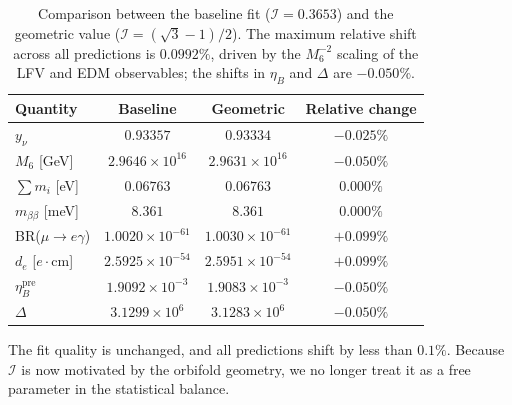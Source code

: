 \documentclass[12pt,a4paper]{article}
\numberwithin{equation}{section}
\begin{document}
\begin{table}[H]
\centering
\caption{Comparison between the baseline fit (\(\mathcal I = 0.3653\)) and the geometric value (\(\mathcal I = (\sqrt{3}-1)/2\)). The maximum relative shift across all predictions is \(0.0992\%\), driven by the \(M_6^{-2}\) scaling of the LFV and EDM observables; the shifts in \(\eta_B\) and \(\Delta\) are \(-0.050\%\).}
\label{tab:I_check}
\begin{tabular}{lccc}
\toprule
Quantity & Baseline & Geometric & Relative change \\
\midrule
\(y_\nu\) & \(0.93357\) & \(0.93334\) & \(-0.025\%\) \\
\(M_6\) [GeV] & \(2.9646\times 10^{16}\) & \(2.9631\times 10^{16}\) & \(-0.050\%\) \\
\(\sum m_i\) [eV] & \(0.06763\) & \(0.06763\) & \(0.000\%\) \\
\(m_{\beta\beta}\) [meV] & \(8.361\) & \(8.361\) & \(0.000\%\) \\
BR(\(\mu\to e\gamma\)) & \(1.0020\times 10^{-61}\) & \(1.0030\times 10^{-61}\) & \(+0.099\%\) \\
\(d_e\) [\(e\cdot\mathrm{cm}\)] & \(2.5925\times 10^{-54}\) & \(2.5951\times 10^{-54}\) & \(+0.099\%\) \\
\(\eta_B^{\mathrm{pre}}\) & \(1.9092\times 10^{-3}\) & \(1.9083\times 10^{-3}\) & \(-0.050\%\) \\
\(\Delta\) & \(3.1299\times 10^6\) & \(3.1283\times 10^6\) & \(-0.050\%\) \\
\bottomrule
\end{tabular}
\end{table}

The fit quality is unchanged, and all predictions shift by less than \(0.1\%\). Because \(\mathcal I\) is now motivated by the orbifold geometry, we no longer treat it as a free parameter in the statistical balance.
\end{document}
